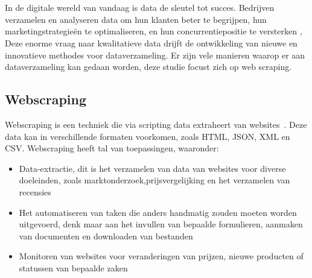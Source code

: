 \chapter{}%
\label{ch:stand-van-zaken}


In de digitale wereld van vandaag is data de sleutel tot succes. Bedrijven verzamelen en analyseren data om hun klanten beter te begrijpen, hun marketingstrategieën te optimaliseren, en hun concurrentiepositie te versterken \autocite{OnesiOzigagun2024},
Deze enorme vraag naar kwalitatieve data drijft de ontwikkeling van nieuwe en innovatieve methodes voor dataverzameling. Er zijn vele manieren waarop er aan dataverzameling kan gedaan worden, deze studie focust zich op web scraping.

\section{Webscraping}
Webscraping is een techniek die via scripting data extraheert van websites~\autocite{Khder2021}. Deze data kan in verschillende formaten voorkomen, zoals HTML, JSON, XML en CSV. Webscraping heeft tal van toepassingen, waaronder:
\begin{itemize}
    \item Data-extractie, dit is het verzamelen van data van websites voor diverse doeleinden,
    zoals marktonderzoek,prijsvergelijking en het verzamelen van recensies
    \item Het automatiseren van taken die anders handmatig zouden moeten worden uitgevoerd, denk maar
    aan het invullen van bepaalde formulieren, aanmaken van documenten en downloaden van bestanden
    \item Monitoren van websites voor veranderingen van prijzen, nieuwe producten of statussen van bepaalde zaken
\end{itemize}

